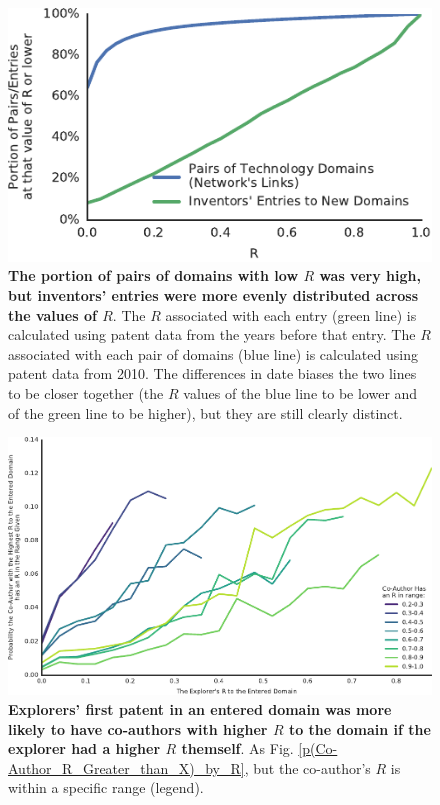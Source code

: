 \documentclass{dsj}
\begin{document}
\begin{figure}[p]
\begin{center}
\includegraphics[width=\columnwidth]{figs/R_frequencies_in_network_and_entries.pdf} 
\end{center}
\caption{\textbf{The portion of pairs of domains with low $R$ was very high, but inventors' entries were more evenly distributed across the values of $R$}. The $R$ associated with each entry (green line) is calculated using patent data from the years before that entry. The $R$ associated with each pair of domains (blue line) is calculated using patent data from 2010. The differences in date biases the two lines to be closer together (the $R$ values of the blue line to be lower and of the green line to be higher), but they are still clearly distinct.
}\label{R_frequencies_in_network_and_entries}
\end{figure}

\begin{figure}[p]
\includegraphics[width=1.3\columnwidth]{figs/p(Co-Author_R_within_X)_by_R.pdf} 
\caption{\textbf{Explorers' first patent in an entered domain was more likely to have co-authors with higher $R$ to the domain if the explorer had a higher $R$ themself}. As Fig. \ref{p(Co-Author_R_Greater_than_X)_by_R}, but the co-author's $R$ is within a specific range (legend). }\label{p(Co-Author_R_within_X)_by_R}
\end{figure}
\end{document}
